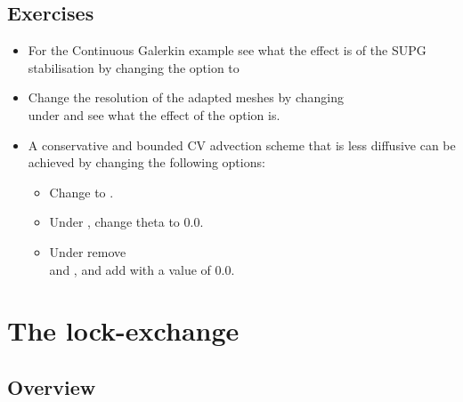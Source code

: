 \subsection{Exercises}
\begin{itemize}
\item For the Continuous Galerkin example see what the effect is of the SUPG stabilisation by
changing the option 
 to 
\item Change the resolution of the adapted meshes by changing \\
under  and see what the effect
of the option
 is.
\item A conservative and bounded CV advection scheme that is less diffusive can be achieved by changing
the following options:
\begin{itemize}
\item Change 
to .
\item Under , change theta to 0.0.
\item Under 
remove \\
 and , and
add  with a value of 0.0.
\end{itemize}
\end{itemize}


\section{The lock-exchange}
\label{sec:lock_exchange}
\subsection{Overview}
\label{sec:lock_exchange_overview}

